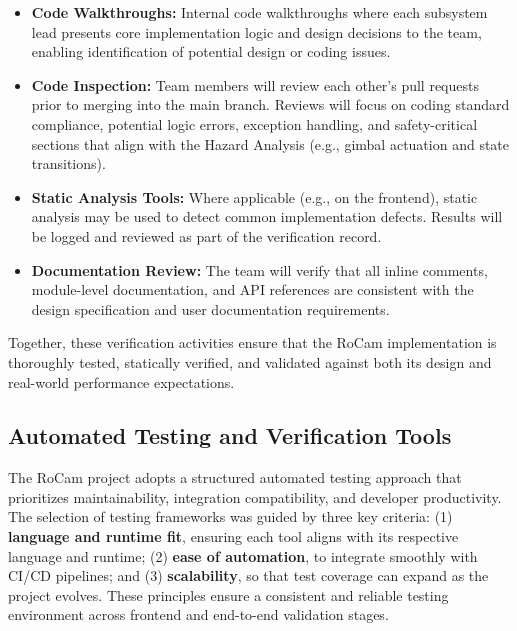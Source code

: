 \documentclass[12pt, titlepage]{article}
\begin{document}
\begin{itemize}
  \item \textbf{Code Walkthroughs:}
        Internal code walkthroughs where each subsystem lead presents core
        implementation logic and design decisions to the team, enabling
        identification of potential design or coding issues.

  \item \textbf{Code Inspection:}
        Team members will review each other’s pull requests prior to
        merging into the main branch.
        Reviews will focus on coding standard compliance, potential
        logic errors, exception handling, and safety-critical sections that align
        with the Hazard Analysis
        (e.g., gimbal actuation and state transitions).

  \item \textbf{Static Analysis Tools:}
        Where applicable (e.g., on the frontend), static analysis may be used to
        detect common implementation defects. Results will be logged and reviewed
        as part of the verification record.

  \item \textbf{Documentation Review:}
        The team will verify that all inline comments, module-level
        documentation, and API references are consistent with the design
        specification and user documentation requirements.
\end{itemize}

\noindent
Together, these verification activities ensure that the RoCam
implementation is thoroughly tested, statically verified, and
validated against both its design and real-world performance expectations.

\subsection{Automated Testing and Verification Tools}

The RoCam project adopts a structured automated testing approach that
prioritizes maintainability, integration compatibility, and developer
productivity. The selection of testing frameworks was guided by three key
criteria: (1) \textbf{language and runtime fit}, ensuring each tool aligns with
its respective language and runtime; (2) \textbf{ease of automation}, to
integrate smoothly with CI/CD pipelines; and (3) \textbf{scalability}, so that
test coverage can expand as the project evolves. These principles ensure a
consistent and reliable testing environment across frontend and end-to-end
validation stages.
\end{document}

